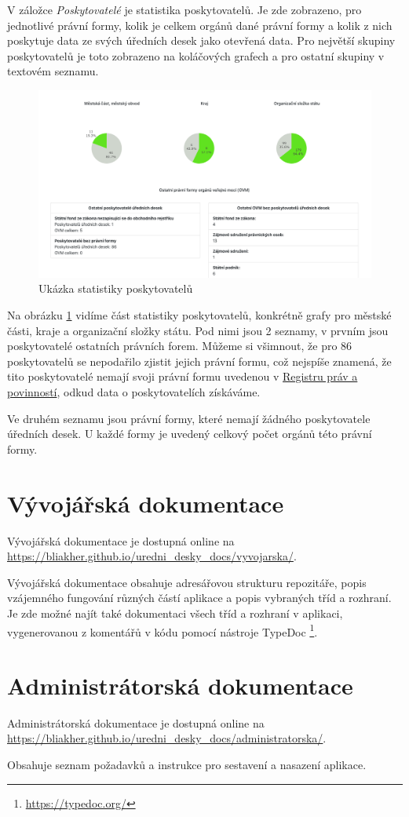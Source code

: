 V záložce \textit{Poskytovatelé} je statistika poskytovatelů. Je zde zobrazeno, pro jednotlivé právní formy, kolik je celkem orgánů dané právní formy a kolik z nich poskytuje data ze svých úředních desek jako otevřená data. Pro největší skupiny poskytovatelů je toto zobrazeno na koláčových grafech a pro ostatní skupiny v textovém seznamu.

\begin{figure}
\centering
\includegraphics[width=\textwidth]{cs/obrazky/screenshots/statistika_poskytovatele.png}
\caption{Ukázka statistiky poskytovatelů}
\label{fig:screen-stat-posk}
\end{figure}

Na obrázku \ref{fig:screen-stat-posk} vidíme část statistiky poskytovatelů, konkrétně grafy pro městské
části, kraje a organizační složky státu. Pod nimi jsou 2 seznamy, v
prvním jsou poskytovatelé ostatních právních forem. Můžeme si všimnout,
že pro 86 poskytovatelů se nepodařilo zjistit jejich právní formu, což
nejspíše znamená, že tito poskytovatelé nemají svoji právní formu
uvedenou v
\href{https://www.szrcr.cz/cs/registr-prav-a-povinnosti}{Registru práv a
povinností}, odkud data o poskytovatelích získáváme.

Ve druhém seznamu jsou právní formy, které nemají žádného poskytovatele
úředních desek. U každé formy je uvedený celkový počet orgánů této
právní formy.


\section{Vývojářská dokumentace}\label{sec:developer-docs}

Vývojářská dokumentace je dostupná online na \url{https://bliakher.github.io/uredni_desky_docs/vyvojarska/}.

Vývojářská dokumentace obsahuje adresářovou strukturu repozitáře, popis vzájemného fungování různých částí aplikace a popis vybraných tříd a rozhraní. Je zde možné najít také dokumentaci všech tříd a rozhraní v aplikaci, vygenerovanou z komentářů v kódu pomocí nástroje TypeDoc \footnote{\url{https://typedoc.org/}}.


\section{Administrátorská dokumentace}\label{sec:admin-docs}

Administrátorská dokumentace je dostupná online na \url{https://bliakher.github.io/uredni_desky_docs/administratorska/}.

Obsahuje seznam požadavků a instrukce pro sestavení a nasazení aplikace.
